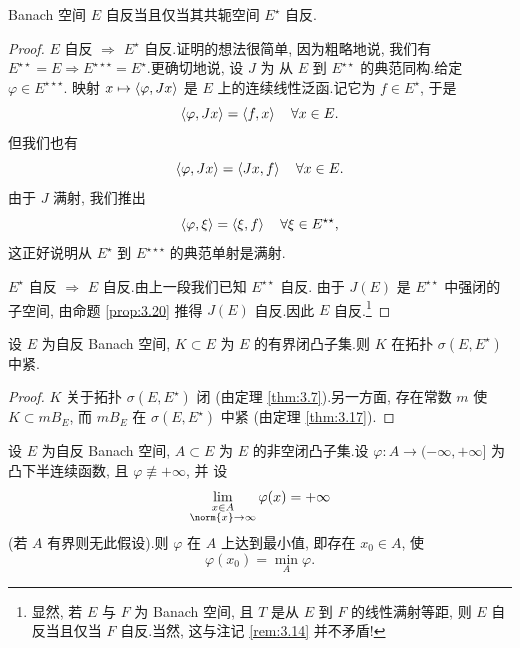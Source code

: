 \begin{corollary}
\label{cor:3.21}
Banach 空间 $E$ 自反当且仅当其共轭空间 $E^\star$ 自反.
\end{corollary}

\begin{proof}
$E$ 自反 $\Rightarrow$ $E^\star$ 自反.证明的想法很简单, 因为粗略地说, 我们有
$E^{\star\star}=E\Rightarrow E^{\star\star\star}=E^\star$.更确切地说, 设 $J$ 为
从 $E$ 到 $E^{\star\star}$ 的典范同构.给定 $\varphi\in E^{\star\star\star}$.
映射 $x\mapsto\left\langle \varphi,Jx\right\rangle$ 是 $E$ 上的连续线性泛函.记它为 $f\in E^\star$,
于是
\begin{equation*}
\left\langle \varphi,Jx\right\rangle=\left\langle f,x\right\rangle\quad\forall x\in E.
\end{equation*}
但我们也有
\begin{equation*}
\left\langle \varphi,Jx\right\rangle=\left\langle Jx,f\right\rangle\quad\forall x\in E.
\end{equation*}
由于 $J$ 满射, 我们推出
\begin{equation*}
\left\langle \varphi,\xi\right\rangle=\left\langle \xi,f\right\rangle\quad\forall\xi\in E^{\star\star},
\end{equation*}
这正好说明从 $E^\star$ 到 $E^{\star\star\star}$ 的典范单射是满射.

$E^\star$ 自反 $\Rightarrow$ $E$ 自反.由上一段我们已知 $E^{\star\star}$ 自反.
由于 $J(E)$ 是 $E^{\star\star}$ 中强闭的子空间, 由命题  \ref{prop:3.20} 推得
$J(E)$ 自反.因此 $E$ 自反.\footnote{显然, 若 $E$ 与 $F$ 为 Banach 空间, 且 $T$
是从 $E$ 到 $F$ 的线性满射等距, 则 $E$ 自反当且仅当 $F$ 自反.当然, 这与注记
\ref{rem:3.14} 并不矛盾!}
\end{proof}

\begin{keycorollary}
\label{cor:3.22}
设 $E$ 为自反 Banach 空间, $K\subset E$ 为 $E$ 的有界闭凸子集.则 $K$ 在拓扑
$\sigma(E,E^\star)$ 中紧.
\end{keycorollary}

\begin{proof}
$K$ 关于拓扑 $\sigma(E,E^\star)$ 闭 (由定理  \ref{thm:3.7}).另一方面, 存在常数
$m$ 使 $K\subset mB_E$, 而 $mB_E$ 在 $\sigma(E,E^\star)$ 中紧 (由定理
 \ref{thm:3.17}).
\end{proof}

\begin{keycorollary}
\label{cor:3.23}
设 $E$ 为自反 Banach 空间, $A\subset E$ 为 $E$ 的非空闭凸子集.设
$\varphi:A\to(-\infty,+\infty]$ 为凸下半连续函数, 且 $\varphi\not\equiv+\infty$, 并
设
\begin{equation}
\lim_{\substack{x\in A\\ \norm{x}\to\infty}}\varphi(x)=+\infty
\label{eq:3.5}
\end{equation}
(若 $A$ 有界则无此假设).则 $\varphi$ 在 $A$ 上达到最小值, 即存在 $x_0\in A$, 使
\begin{equation*}
\varphi(x_0)=\min_A\varphi.
\end{equation*}
\end{keycorollary}

